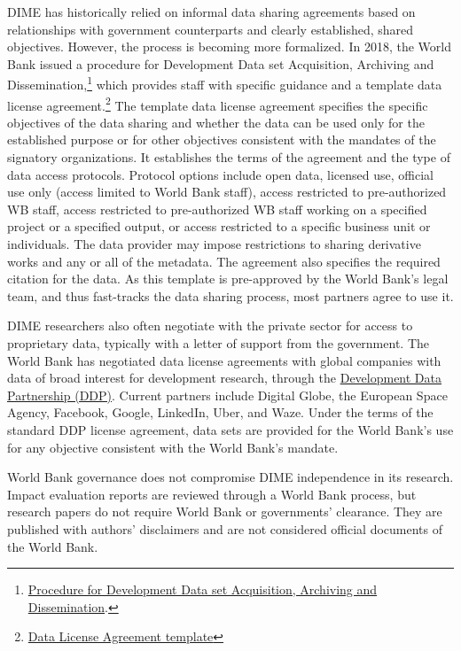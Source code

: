 DIME has historically relied on informal data sharing agreements based on relationships with government counterparts and clearly established, shared objectives. However, the process is becoming more formalized. In 2018, the World Bank issued a procedure for Development Data set Acquisition, Archiving and Dissemination,\footnote{\href{https://policies.worldbank.org/sites/ppf3/PPFDocuments/17edbe3e480a4ee491d7c6a4e2ae9f32.pdf}{Procedure for Development Data set Acquisition, Archiving and Dissemination}.} which provides staff with specific guidance and a template data license agreement.\footnote{\href{https://worldbankgroup.sharepoint.com/teams/ddh/SiteAssets/SitePages/ddh/DataLicenseAgreementTemplate_v4.pdf}{Data License Agreement template}} The template data license agreement specifies the specific objectives of the data sharing and whether the data can be used only for the established purpose or for other objectives consistent with the mandates of the signatory organizations. It establishes the terms of the agreement and the type of data access protocols. Protocol options include open data, licensed use, official use only (access limited to World Bank staff), access restricted to pre-authorized WB staff, access restricted to pre-authorized WB staff working on a specified project or a specified output, or access restricted to a specific business unit or individuals. The data provider may impose restrictions to sharing derivative works and any or all of the metadata. The agreement also specifies the required citation for the data. As this template is pre-approved by the World Bank's legal team, and thus fast-tracks the data sharing process, most partners agree to use it.

DIME researchers also often negotiate with the private sector for access to proprietary data, typically with a letter of support from the government. The World Bank has negotiated data license agreements with global companies with data of broad interest for development research, through the \href{https://datapartnership.org/}{Development Data Partnership (DDP)}. Current partners include Digital Globe, the European Space Agency, Facebook, Google, LinkedIn, Uber, and Waze. Under the terms of the standard DDP license agreement, data sets are provided for the World Bank's use for any objective consistent with the World Bank's mandate.

World Bank governance does not compromise DIME independence in its research. Impact evaluation reports are reviewed through a World Bank process, but research papers do not require World Bank or governments' clearance. They are published with authors' disclaimers and are not considered official documents of the World Bank.

